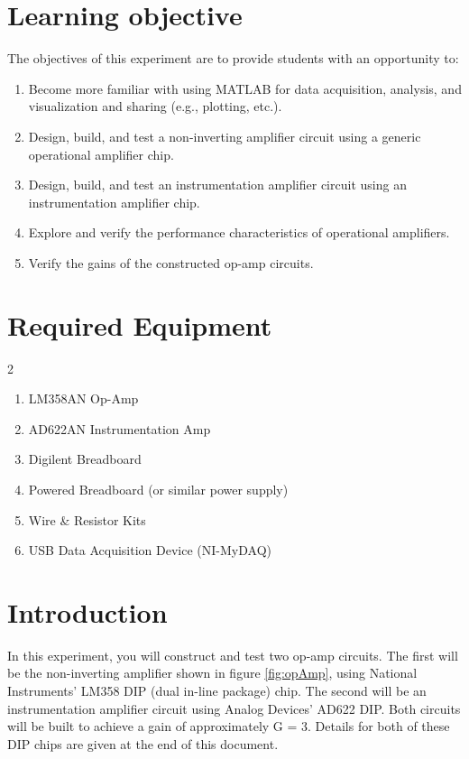 \documentclass{article} %
\begin{document}


\clearpage

\section{Learning objective}
The objectives of this experiment are to provide students with an opportunity to:

\begin{enumerate}
    \item Become more familiar with using MATLAB for data acquisition, analysis, and visualization and sharing (e.g., plotting, etc.).
    \item Design, build, and test a non-inverting amplifier circuit using a generic operational amplifier chip.
    \item Design, build, and test an instrumentation amplifier circuit using an instrumentation amplifier chip.
    \item Explore and verify the performance characteristics of operational amplifiers.
    \item Verify the gains of the constructed op-amp circuits.
\end{enumerate}

\section{Required Equipment}
\begin{multicols}{2}
    \begin{enumerate}
        \item LM358AN Op-Amp
        \item AD622AN Instrumentation Amp
        \item Digilent Breadboard
        \item Powered Breadboard (or similar power supply)
        \item Wire \& Resistor Kits
        \item USB Data Acquisition Device (NI-MyDAQ)
    \end{enumerate}
\end{multicols}

\section{Introduction}
In this experiment, you will construct and test two op-amp circuits. The first will be the non-inverting amplifier shown in figure \ref{fig:opAmp}, using National Instruments’ LM358 DIP (dual in-line package) chip. The second will be an instrumentation amplifier circuit using Analog Devices’ AD622 DIP. Both circuits will be built to achieve a gain of approximately G = 3.  Details for both of these DIP chips are given at the end of this document.
\end{document}
